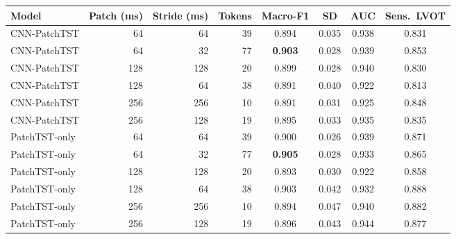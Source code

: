 \begin{tabular}{lrrrcccc}
\toprule
Model & Patch (ms) & Stride (ms) & Tokens & Macro-F1 & SD & AUC & Sens.\ LVOT \\
\midrule
CNN-PatchTST & 64 & 64 & 39 & 0.894 & 0.035 & 0.938 & 0.831 \\
CNN-PatchTST & 64 & 32 & 77 & \textbf{0.903} & 0.028 & 0.939 & 0.853 \\
CNN-PatchTST & 128 & 128 & 20 & 0.899 & 0.028 & 0.940 & 0.830 \\
CNN-PatchTST & 128 & 64 & 38 & 0.891 & 0.040 & 0.922 & 0.813 \\
CNN-PatchTST & 256 & 256 & 10 & 0.891 & 0.031 & 0.925 & 0.848 \\
CNN-PatchTST & 256 & 128 & 19 & 0.895 & 0.033 & 0.935 & 0.835 \\
\addlinespace
PatchTST-only & 64 & 64 & 39 & 0.900 & 0.026 & 0.939 & 0.871 \\
PatchTST-only & 64 & 32 & 77 & \textbf{0.905} & 0.028 & 0.933 & 0.865 \\
PatchTST-only & 128 & 128 & 20 & 0.893 & 0.030 & 0.922 & 0.858 \\
PatchTST-only & 128 & 64 & 38 & 0.903 & 0.042 & 0.932 & 0.888 \\
PatchTST-only & 256 & 256 & 10 & 0.894 & 0.047 & 0.940 & 0.882 \\
PatchTST-only & 256 & 128 & 19 & 0.896 & 0.043 & 0.944 & 0.877 \\
\bottomrule
\end{tabular}

